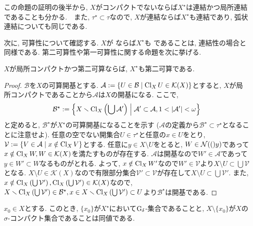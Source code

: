 \documentclass[uplatex, dvipdfmx, a4paper, 12pt, class=jsbook, crop=false]{standalone}
\begin{document}
この命題の証明の後半から, $ X $がコンパクトでないならば$ X^\star $は連結かつ局所連結であることも分かる.　また, $ \tau^\star \subset \tau $なので, $ X $が連結ならば$ X^\star $も連結であり, 弧状連結についても同じである.

次に, 可算性について確認する. $ X $が \Lindelof ならば$ X^\star $も \Lindelof であることは, 連結性の場合と同様である. 第二可算性や第一可算性に関する命題を次に挙げる.
\begin{proposition}
	$ X $が局所コンパクトかつ第二可算ならば, $ X^\star $も第二可算である.
\end{proposition}

\begin{proof}
	$ \mathcal{B} $を$ X $の可算開基とする. $ \mathcal{A} \defeq \setcomp{U \in \mathcal{B}}{\topcl_{X}U \in \mathcal{K}(X)} $とすると, $ X $が局所コンパクトであることから$ \mathcal{A} $は$ X $の開基になる.
	ここで,
	$$ \mathcal{B}^\star \defeq \setcomp{X \setminus \topcl_{X} \left(\bigcup \mathcal{A}'\right)}{\mathcal{A}' \subset \mathcal{A}, 1 < \cardinality{\mathcal{A}'} < \omega} $$
	と定めると, $ \mathcal{B}^\star $が$ X^\star $の可算開基になることを示す ($ \mathcal{A} $の定義から$ \mathcal{B}^\star \subset \tau^\star $となることに注意せよ). 任意の空でない開集合$ U \in \tau^\star $と任意の$ x \in U $をとり, $ \mathcal{V} \defeq \setcomp{V \in \mathcal{A}}{x \notin \topcl_{X} V} $とする. 任意に$ y \in X \setminus U $をとると, $ W \in \topnbd(y) $であって$ x \notin \mathop{\mathrm{Cl}}\nolimits_X W, W \in \mathcal{K}(X) $を満たすものが存在する. $ \mathcal{A} $は開基なので$ W' \in \mathcal{A} $であって$ y \in W' \subset W $なるものがとれる. よって, $ x \notin \mathop{\mathrm{Cl}}\nolimits_X{W}' $なので$ W' \in \mathcal{V} $より$ X \setminus U \subset \bigcup \mathcal{V} $となる. $ X \setminus U \in \mathcal{K}(X) $なので有限部分集合$ \mathcal{V}' \subset \mathcal{V} $が存在して$ X \setminus U \subset \bigcup \mathcal{V}' $. また, $ x \notin \mathop{\mathrm{Cl}}\nolimits_X \left(\bigcup \mathcal{V}'\right), \mathop{\mathrm{Cl}}\nolimits_X\left(\bigcup \mathcal{V}'\right) \in \mathcal{K}(X) $なので, $ X \smallsetminus \mathop{\mathrm{Cl}}\nolimits_X \left(\bigcup \mathcal{V}'\right) \in \mathcal{B}^\star, x \in X \smallsetminus \mathop{\mathrm{Cl}}\nolimits_X \left(\bigcup \mathcal{V}'\right) \subset U $より$ \mathcal{B}^\star $は開基である.
\end{proof}

\begin{proposition}
	$ x_0 \in X $とする. このとき, $ \{x_0\} $が$ X^\star $において$ \mathrm{G}_{\delta} $-集合であることと, $ X \setminus \{x_0\} $が$ X $の$ \sigma $-コンパクト集合であることは同値である.
\end{proposition}
\end{document}
